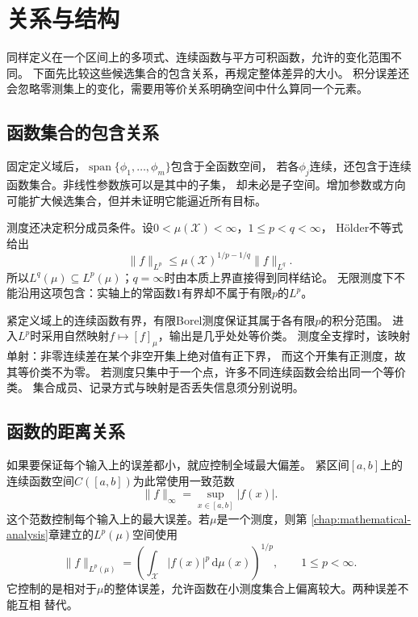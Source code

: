 \section{关系与结构}
\label{sec:functional-relations}

同样定义在一个区间上的多项式、连续函数与平方可积函数，允许的变化范围不同。
下面先比较这些候选集合的包含关系，再规定整体差异的大小。
积分误差还会忽略零测集上的变化，需要用等价关系明确空间中什么算同一个元素。

\subsection{函数集合的包含关系}
\label{sec:functional-inclusion-relations}

固定定义域后，$\operatorname{span}\{\phi_1,\ldots,\phi_m\}$包含于全函数空间，
若各$\phi_j$连续，还包含于连续函数集合。非线性参数族可以是其中的子集，
却未必是子空间。增加参数或方向可能扩大候选集合，但并未证明它能逼近所有目标。

测度还决定积分成员条件。设$0<\mu(\mathcal X)<\infty$，$1\leq p<q<\infty$，
Hölder不等式给出
\[
 \lVert f\rVert_{L^p}\leq
 \mu(\mathcal X)^{1/p-1/q}\lVert f\rVert_{L^q}.
\]
所以$L^q(\mu)\subseteq L^p(\mu)$；$q=\infty$时由本质上界直接得到同样结论。
无限测度下不能沿用这项包含：实轴上的常函数$1$有界却不属于有限$p$的$L^p$。

紧定义域上的连续函数有界，有限Borel测度保证其属于各有限$p$的积分范围。
进入$L^p$时采用自然映射$f\mapsto[f]_\mu$，输出是几乎处处等价类。
测度全支撑时，该映射单射：非零连续差在某个非空开集上绝对值有正下界，
而这个开集有正测度，故其等价类不为零。
若测度只集中于一个点，许多不同连续函数会给出同一个等价类。
集合成员、记录方式与映射是否丢失信息须分别说明。

\subsection{函数的距离关系}
\label{sec:functional-distance-relations}

如果要保证每个输入上的误差都小，就应控制全域最大偏差。
紧区间$[a,b]$上的连续函数空间$C([a,b])$为此常使用一致范数
\[
  \lVert f\rVert_{\infty}
  =\sup_{x\in[a,b]}|f(x)|.
\]
这个范数控制每个输入上的最大误差。若$\mu$是一个测度，则第
\ref{chap:mathematical-analysis}章建立的$L^p(\mu)$空间使用
\[
  \lVert f\rVert_{L^p(\mu)}
  =
  \left(\int_{\mathcal{X}}|f(x)|^p\,\mathrm{d}\mu(x)\right)^{1/p},
  \qquad 1\leq p<\infty.
\]
它控制的是相对于$\mu$的整体误差，允许函数在小测度集合上偏离较大。两种误差不能互相
替代。



